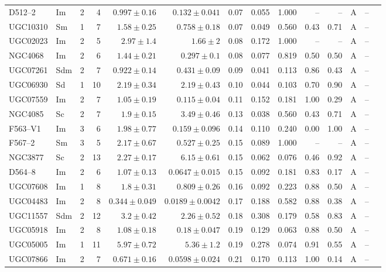 \documentclass[9pt]{extarticle}
\begin{document}
{\begin{longtable}{lllrrrrrrrrcrl}
D512--2 & Im & 2 & 4 & $0.997\pm0.16$ & $0.132\pm0.041$ & 0.07 & 0.055 & 1.000 & -- & -- & A & -- & \\
UGC10310 & Sm & 1 & 7 & $1.58\pm0.25$ & $0.758\pm0.18$ & 0.07 & 0.049 & 0.560 & 0.43 & 0.71 & A & -- & \\
UGC02023 & Im & 2 & 5 & $2.97\pm1.4$ & $1.66\pm2$ & 0.08 & 0.172 & 1.000 & -- & -- & A & -- & \\
NGC4068 & Im & 2 & 6 & $1.44\pm0.21$ & $0.297\pm0.1$ & 0.08 & 0.077 & 0.819 & 0.50 & 0.50 & A & -- & \\
UGC07261 & Sdm & 2 & 7 & $0.922\pm0.14$ & $0.431\pm0.09$ & 0.09 & 0.041 & 0.113 & 0.86 & 0.43 & A & -- & \\
UGC06930 & Sd & 1 & 10 & $2.19\pm0.34$ & $2.19\pm0.43$ & 0.10 & 0.044 & 0.103 & 0.70 & 0.90 & A & -- & \\
UGC07559 & Im & 2 & 7 & $1.05\pm0.19$ & $0.115\pm0.04$ & 0.11 & 0.152 & 0.181 & 1.00 & 0.29 & A & -- & \\
NGC4085 & Sc & 2 & 7 & $1.9\pm0.15$ & $3.49\pm0.46$ & 0.13 & 0.038 & 0.560 & 0.43 & 0.71 & A & -- & \\
F563--V1 & Im & 3 & 6 & $1.98\pm0.77$ & $0.159\pm0.096$ & 0.14 & 0.110 & 0.240 & 0.00 & 1.00 & A & -- & \\
F567--2 & Sm & 3 & 5 & $2.17\pm0.67$ & $0.527\pm0.25$ & 0.15 & 0.089 & 1.000 & -- & -- & A & -- & \\
NGC3877 & Sc & 2 & 13 & $2.27\pm0.17$ & $6.15\pm0.61$ & 0.15 & 0.062 & 0.076 & 0.46 & 0.92 & A & -- & \\
D564--8 & Im & 2 & 6 & $1.07\pm0.13$ & $0.0647\pm0.015$ & 0.15 & 0.092 & 0.181 & 0.83 & 0.17 & A & -- & \\
UGC07608 & Im & 1 & 8 & $1.8\pm0.31$ & $0.809\pm0.26$ & 0.16 & 0.092 & 0.223 & 0.88 & 0.50 & A & -- & \\
UGC04483 & Im & 2 & 8 & $0.344\pm0.049$ & $0.0189\pm0.0042$ & 0.17 & 0.188 & 0.582 & 0.88 & 0.38 & A & -- & \\
UGC11557 & Sdm & 2 & 12 & $3.2\pm0.42$ & $2.26\pm0.52$ & 0.18 & 0.308 & 0.179 & 0.58 & 0.83 & A & -- & \\
UGC05918 & Im & 2 & 8 & $1.08\pm0.18$ & $0.18\pm0.047$ & 0.19 & 0.129 & 0.063 & 0.88 & 0.50 & A & -- & \\
UGC05005 & Im & 1 & 11 & $5.97\pm0.72$ & $5.36\pm1.2$ & 0.19 & 0.278 & 0.074 & 0.91 & 0.55 & A & -- & \\
UGC07866 & Im & 2 & 7 & $0.671\pm0.16$ & $0.0598\pm0.024$ & 0.21 & 0.170 & 0.113 & 1.00 & 0.14 & A & -- & \\

\end{longtable}}
\end{document}

